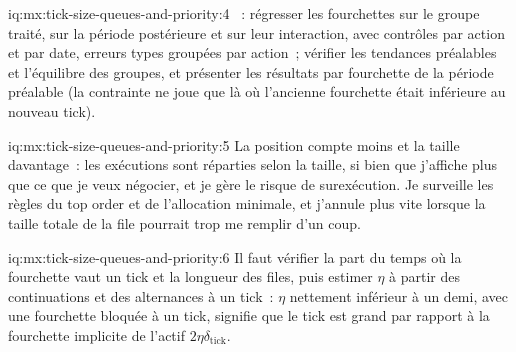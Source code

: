 \begin{solution}{iq:mx:tick-size-queues-and-priority:4}
~: régresser les fourchettes sur le groupe traité, sur la période postérieure et sur leur interaction, avec contrôles par action et par date, erreurs types groupées par action~;
vérifier les tendances préalables et l'équilibre des groupes, et présenter les résultats par fourchette de la période préalable (la contrainte ne joue que là où l'ancienne fourchette était inférieure au nouveau tick).
\end{solution}

\begin{solution}{iq:mx:tick-size-queues-and-priority:5}
La position compte moins et la taille davantage~: les exécutions sont réparties selon la taille, si bien que j'affiche plus que ce que je veux négocier, et je gère le risque de surexécution. Je surveille les règles du top order et
de l'allocation minimale, et j'annule plus vite lorsque la taille totale de la file pourrait trop me remplir d'un coup.
\end{solution}

\begin{solution}{iq:mx:tick-size-queues-and-priority:6}
Il faut vérifier la part du temps où la fourchette vaut un tick et la longueur des files, puis estimer $\eta$ à partir des continuations et des alternances à un tick~: $\eta$ nettement inférieur
à un demi, avec une fourchette bloquée à un tick, signifie que le tick est grand par rapport à la fourchette implicite de l'actif $2\eta\delta_{\mathrm{tick}}$.
\end{solution}

